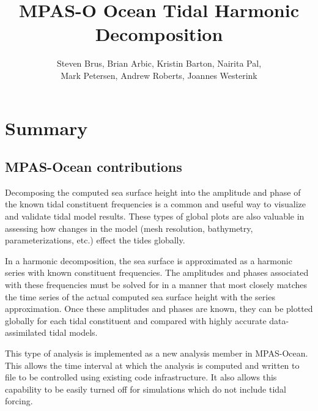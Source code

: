 \documentclass[11pt]{report}
\begin{document}
\title{MPAS-O Ocean Tidal Harmonic Decomposition }
\author{Steven Brus, Brian Arbic, Kristin Barton, Nairita Pal, \\ Mark Petersen, Andrew Roberts, Joannes Westerink }


 
\maketitle
\tableofcontents


\chapter{Summary}




\section{MPAS-Ocean contributions}
Decomposing the computed sea surface height into the amplitude and phase of the known tidal constituent frequencies is a common and useful way to visualize and validate tidal model results. These types of global plots are also valuable in assessing how changes in the model (mesh resolution, bathymetry, parameterizations, etc.) effect the tides globally. 

In a harmonic decomposition, the sea surface is approximated as a harmonic series with known constituent frequencies. The amplitudes and phases associated with these frequencies must be solved for in a manner that most closely matches the time series of the actual computed sea surface height with the series approximation. Once these amplitudes and phases are known, they can be plotted globally for each tidal constituent and compared with highly accurate data-assimilated tidal models.

This type of analysis is implemented as a new analysis member in MPAS-Ocean. This allows the time interval at which the analysis is computed and written to file to be controlled using existing code infrastructure. It also allows this capability to be easily turned off for simulations which do not include tidal forcing.
\end{document}
